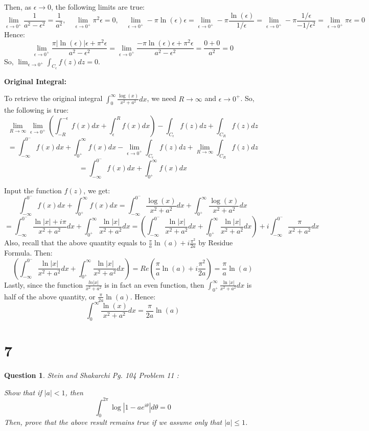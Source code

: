 \documentclass{article}
\newtheorem{question}{Question}
\begin{document}
Then, as $\epsilon\rightarrow 0$, the following limits are true:
$$\lim_{\epsilon\rightarrow 0^+}\frac{1}{a^2-\epsilon^2} = \frac{1}{a^2},\quad \lim_{\epsilon\rightarrow 0^+}\pi^2\epsilon = 0,\quad \lim_{\epsilon\rightarrow 0^+}-\pi\ln(\epsilon)\epsilon = \lim_{\epsilon\rightarrow 0^+}-\pi\frac{\ln(\epsilon)}{1/\epsilon} = \lim_{\epsilon\rightarrow 0^+}-\pi\frac{1/\epsilon}{-1/\epsilon^2} = \lim_{\epsilon\rightarrow 0^+}\pi \epsilon = 0$$
Hence:
$$\lim_{\epsilon\rightarrow 0^+}\frac{\pi|\ln(\epsilon)|\epsilon +\pi^2\epsilon}{a^2-\epsilon^2} = \lim_{\epsilon\rightarrow 0^+}\frac{-\pi\ln(\epsilon)\epsilon +\pi^2\epsilon}{a^2-\epsilon^2} = \frac{0+0}{a^2}=0$$
So, $\lim_{\epsilon\rightarrow 0^+}\int_{C_\epsilon}f(z)dz = 0$.

\hfil

\textbf{Original Integral:}

To retrieve the original integral $\int_{0}^{\infty}\frac{\log(x)}{x^2+a^2}dx$, we need $R\rightarrow\infty$ and $\epsilon\rightarrow 0^+$. So, the following is true:
$$\lim_{R\rightarrow\infty}\lim_{\epsilon\rightarrow 0^+}\left(\int_{-R}^{-\epsilon}f(x)dx+\int_{\epsilon}^{R}f(x)dx\right) - \int_{C_\epsilon}f(z)dz + \int_{C_R}f(z)dz$$
$$ = \int_{-\infty}^{0^-}f(x)dx + \int_{0^+}^{\infty}f(x)dx - \lim_{\epsilon\rightarrow 0^+}\int_{C_\epsilon}f(z)dz + \lim_{R\rightarrow\infty}\int_{C_R}f(z)dz$$
$$ = \int_{-\infty}^{0^-}f(x)dx + \int_{0^+}^{\infty}f(x)dx$$

Input the function $f(z)$, we get:
$$\int_{-\infty}^{0^-}f(x)dx + \int_{0^+}^{\infty}f(x)dx = \int_{-\infty}^{0^-}\frac{\log(x)}{x^2+a^2}dx + \int_{0^+}^{\infty}\frac{\log(x)}{x^2+a^2}dx$$
$$=\int_{-\infty}^{0^-}\frac{\ln|x|+i\pi}{x^2+a^2}dx + \int_{0^+}^{\infty}\frac{\ln|x|}{x^2+a^2}dx = \left(\int_{-\infty}^{0^-}\frac{\ln|x|}{x^2+a^2}dx + \int_{0^+}^{\infty}\frac{\ln|x|}{x^2+a^2}dx\right)+i\int_{-\infty}^{0^-}\frac{\pi}{x^2+a^2}dx$$
Also, recall that the above quantity equals to $\frac{\pi}{a}\ln(a)+i\frac{\pi^2}{2a}$ by Residue Formula. Then:
$$\left(\int_{-\infty}^{0^-}\frac{\ln|x|}{x^2+a^2}dx + \int_{0^+}^{\infty}\frac{\ln|x|}{x^2+a^2}dx\right) = Re\left(\frac{\pi}{a}\ln(a)+i\frac{\pi^2}{2a}\right) = \frac{\pi}{a}\ln(a)$$
Lastly, since the function $\frac{ln|x|}{x^2+a^2}$ is in fact an even function, then $\int_{0^+}^{\infty}\frac{\ln|x|}{x^2+a^2}dx$ is half of the above quantity, or $\frac{\pi}{2a}\ln(a)$.
Hence:
$$\int_{0}^{\infty}\frac{\ln(x)}{x^2+a^2}dx = \frac{\pi}{2a}\ln(a)$$

\break

\section*{7}
\begin{myBox}[]{}
    \begin{question} Stein and Shakarchi Pg. 104 Problem 11
        :

        Show that if $|a|<1$, then
        $$\int_{0}^{2\pi}\log|1-ae^{i\theta}|d\theta =0$$
        Then, prove that the above result remains true if we assume only that $|a|\leq 1$.
    \end{question}
\end{myBox}
\end{document}
